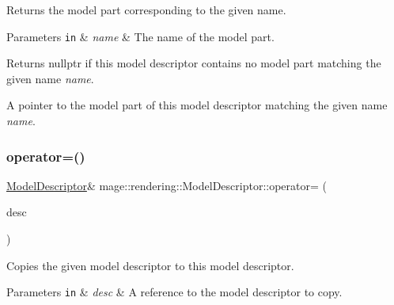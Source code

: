 Returns the model part corresponding to the given name.


\begin{DoxyParams}[1]{Parameters}
\mbox{\tt in}  & {\em name} & The name of the model part. \\
\hline
\end{DoxyParams}
\begin{DoxyReturn}{Returns}
{\ttfamily nullptr} if this model descriptor contains no model part matching the given name {\itshape name}. 

A pointer to the model part of this model descriptor matching the given name {\itshape name}. 
\end{DoxyReturn}
\mbox{\label{classmage_1_1rendering_1_1_model_descriptor_a6d27a72aa2ebffbe4e7f2635f803dd72}} 
\subsubsection{\texorpdfstring{operator=()}{operator=()}\hspace{0.1cm}{\footnotesize\ttfamily [1/2]}}
{\footnotesize\ttfamily \mbox{\hyperlink{classmage_1_1rendering_1_1_model_descriptor}{Model\+Descriptor}}\& mage\+::rendering\+::\+Model\+Descriptor\+::operator= (\begin{DoxyParamCaption}\item[{const \mbox{\hyperlink{classmage_1_1rendering_1_1_model_descriptor}{Model\+Descriptor}} \&}]{desc }\end{DoxyParamCaption})\hspace{0.3cm}{\ttfamily [delete]}}

Copies the given model descriptor to this model descriptor.


\begin{DoxyParams}[1]{Parameters}
\mbox{\tt in}  & {\em desc} & A reference to the model descriptor to copy. \\
\hline
\end{DoxyParams}
\mbox{\label{classmage_1_1rendering_1_1_model_descriptor_a52e9fbf292efc7a803d367bb3b6cb962}} 
